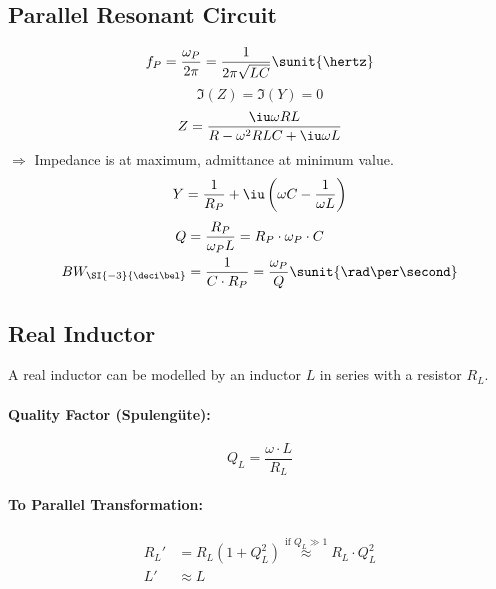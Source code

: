 	\subsection{Parallel Resonant Circuit} %
		\[
			f_P = \frac{\omega_P}{2\pi} = \frac{1}{2\pi\sqrt{LC}} \sunit{\hertz}
		\]
		\[
			\Im(Z) = \Im(Y) = 0
		\]
		\[
			Z = \frac{\iu \omega R L}{R - \omega^2 RLC + \iu \omega L}
		\]
		$\Rightarrow$ Impedance is at maximum, admittance at minimum value.
		\begin{gather*}
			Y = \frac{1}{R_P} + \iu \left(
				\omega C - \frac{1}{\omega L}
			\right)
		\end{gather*}
		\begin{align*}
			Q &= \frac{R_P}{\omega_P L} = R_P \cdot \omega_P \cdot C \\
			BW_{\SI{-3}{\deci\bel}} &= \frac{1}{C\cdot R_P} = \frac{\omega_P}{Q} \sunit{\rad\per\second}
		\end{align*}
	
	\subsection{Real Inductor} %
		\begin{wrapfigure}{r}{.3\columnwidth}
			\vspace{-7mm}
		\end{wrapfigure}
		A real inductor can be modelled by an inductor $L$ in series with a resistor $R_L$.
		

		\paragraph{Quality Factor (Spulengüte):} %
			\[
				Q_L = \frac{\omega \cdot L}{R_L}
			\]
		
		\begin{wrapfigure}[0]{r}{.3\columnwidth}
		\end{wrapfigure}
		\paragraph{To Parallel Transformation:} %
			\begin{align*}
				R_L' &= R_L (1+ Q_L^2) \stackrel{\text{if $Q_L \gg 1$}}{\approx} R_L \cdot Q_L^2\\
				L' &\approx L
			\end{align*}
			
